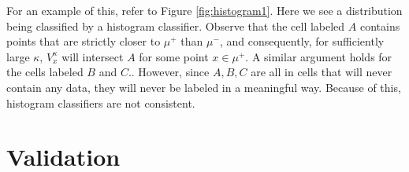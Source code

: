 For an example of this, refer to Figure \ref{fig:histogram1}. Here we see a distribution being classified by a histogram classifier. Observe that the cell labeled $A$ contains points that are strictly closer to $\mu^+$ than $\mu^-$, and consequently, for sufficiently large $\kappa$, $V_x^{\kappa}$ will intersect $A$ for some point $x \in \mu^+$. A similar argument holds for the cells labeled $B$ and $C.$. However, since $A, B, C$ are all in cells that will never contain any data, they will never be labeled in a meaningful way. Because of this, histogram classifiers are not \ncons\emph{ }consistent.

\section{Validation}


